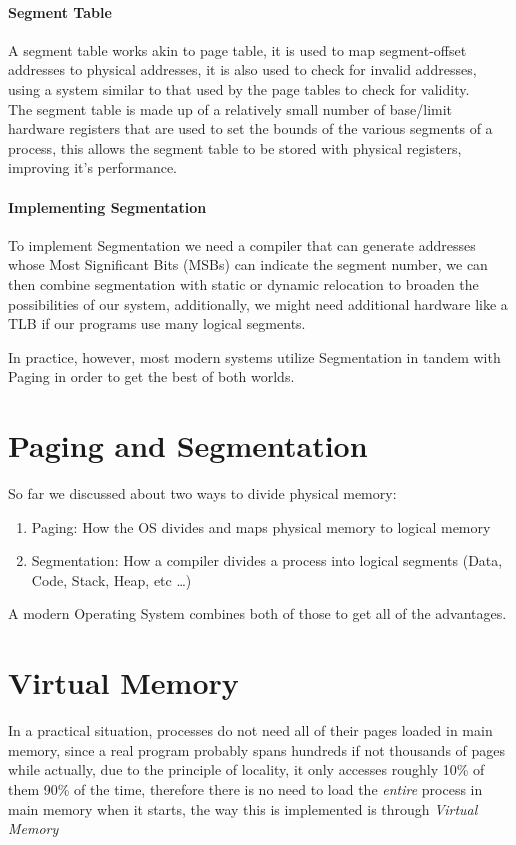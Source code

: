 \documentclass[openright, twoside]{report}
\theoremstyle{definition}
\theoremstyle{example}
\begin{document}
\paragraph{Segment Table}
A segment table works akin to page table, it is used to map segment-offset addresses 
to physical addresses, it is also used to check for invalid addresses, using 
a system similar to that used by the page tables to check for validity.\\

The segment table is made up of a relatively small number of base/limit hardware registers 
that are used to set the bounds of the various segments of a process, this allows the segment 
table to be stored with physical registers, improving it's performance.

\paragraph{Implementing Segmentation}
To implement Segmentation we need a compiler that can generate addresses 
whose Most Significant Bits (MSBs) can indicate the segment number, we can then 
combine segmentation with static or dynamic relocation to broaden the possibilities of 
our system, additionally, we might need additional hardware like a TLB if our programs 
use many logical segments.

In practice, however, most modern systems utilize Segmentation in tandem with Paging 
in order to get the best of both worlds.

\section{Paging and Segmentation}
So far we discussed about two ways to divide physical memory:

\begin{enumerate}
	\item Paging: How the OS divides and maps physical memory to logical memory
	\item Segmentation: How a compiler divides a process into logical segments (Data, Code, Stack, Heap, etc \dots)
\end{enumerate}

A modern Operating System combines both of those to get all of the advantages.

\section{Virtual Memory}
\label{sec:vmem}
In a practical situation, processes do not need all of their pages loaded in main memory, since 
a real program probably spans hundreds if not thousands of pages while actually, due to 
the principle of locality, it only accesses roughly 10\% of them 90\% of the time, therefore 
there is no need to load the \emph{entire} process in main memory when it starts, the way this 
is implemented is through \emph{Virtual Memory}
\end{document}
